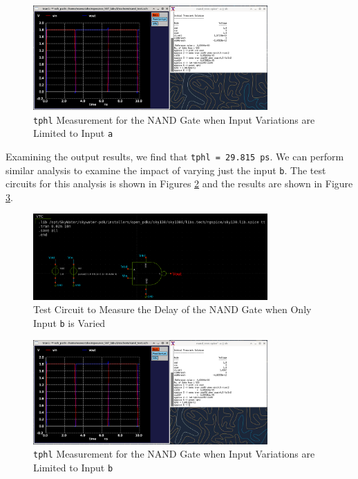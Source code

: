 \documentclass[fleqn]{article}
\begin{document}
	\begin{figure}[H]
		\centerline{\includegraphics[width=0.8\textwidth]{nand_delay_sweep_va.png}}
		\caption{\texttt{tphl} Measurement for the NAND Gate when Input Variations are Limited to Input \texttt{a}}
		\label{fig::nand_delay_sweep_va}
	\end{figure}
	
	Examining the output results, we find that \texttt{tphl = 29.815 ps}. We can perform similar analysis to examine the impact of varying just the input \texttt{b}. The test circuits for this analysis is shown in Figures \ref{fig::nand_delay_test_sweep_vb} and the results are shown in Figure \ref{fig::nand_delay_sweep_vb}.
	
	\begin{figure}[H]
		\centerline{\includegraphics[width=0.8\textwidth]{nand_delay_test_sweep_vb.png}}
		\caption{Test Circuit to Measure the Delay of the NAND Gate when Only Input \texttt{b} is Varied}
		\label{fig::nand_delay_test_sweep_vb}
	\end{figure}
	
	\begin{figure}[H]
		\centerline{\includegraphics[width=0.8\textwidth]{nand_delay_sweep_vb.png}}
		\caption{\texttt{tphl} Measurement for the NAND Gate when Input Variations are Limited to Input \texttt{b}}
		\label{fig::nand_delay_sweep_vb}
	\end{figure}
	
\end{document}
